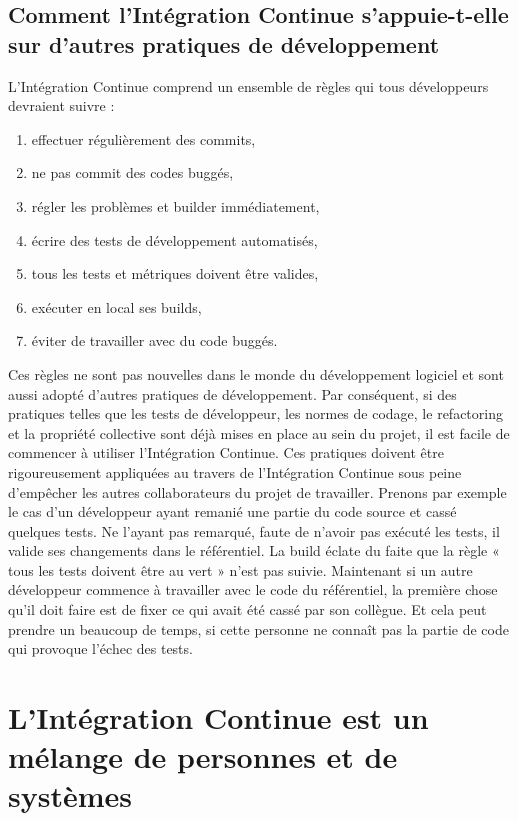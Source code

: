 \documentclass{report}
\begin{document}
      \subsection{Comment l’Intégration Continue s’appuie-t-elle sur d’autres pratiques de développement}
      L’Intégration Continue comprend un ensemble de règles qui tous développeurs devraient suivre :

      \begin{enumerate}
        \item effectuer régulièrement des commits,
        \item ne pas commit des codes buggés,
        \item régler les problèmes et builder immédiatement,
        \item écrire des tests de développement automatisés,
        \item tous les tests et métriques doivent être valides,
        \item exécuter en local ses builds,
        \item éviter de travailler avec du code buggés.\\
      \end{enumerate}

      Ces règles ne sont pas nouvelles dans le monde du développement logiciel et sont aussi adopté d'autres pratiques de développement. Par conséquent, si des pratiques telles que les tests de développeur, les normes de codage, le refactoring et la propriété collective sont déjà mises en place au sein du projet, il est facile de commencer à utiliser l’Intégration Continue. Ces pratiques doivent être rigoureusement appliquées au travers de l’Intégration Continue sous peine d’empêcher les autres collaborateurs du projet de travailler. Prenons par exemple le cas d’un développeur ayant remanié une partie du code source et cassé quelques tests. Ne l’ayant pas remarqué, faute de n’avoir pas exécuté les tests, il valide ses changements dans le référentiel. La build éclate du faite que la règle « tous les tests doivent être au vert » n’est pas suivie. Maintenant si un autre développeur commence à travailler avec le code du référentiel, la première chose qu'il doit faire est de fixer ce qui avait été cassé par son collègue. Et cela peut prendre un beaucoup de temps, si cette personne ne connaît pas la partie de code qui provoque l’échec des tests.

    \section{L’Intégration Continue est un mélange de personnes et de systèmes}
\end{document}
